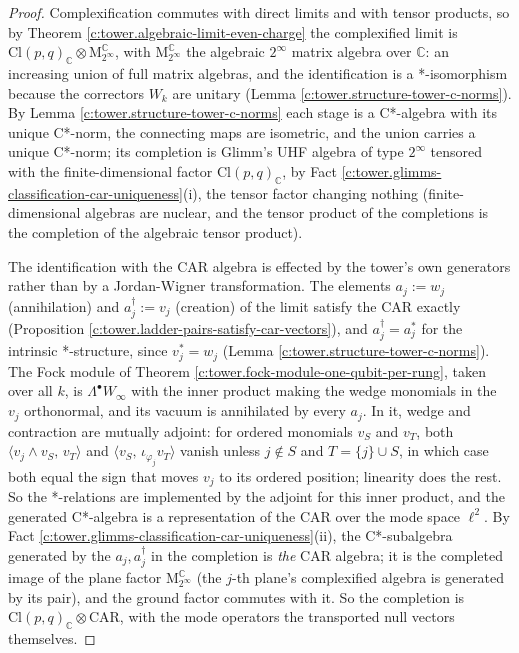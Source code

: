 \documentclass[11pt]{article}
\theoremstyle{definition}
\theoremstyle{plain}
\providecommand{\C}{}\renewcommand{\C}{\mathbb{C}}
\providecommand{\CAR}{}\renewcommand{\CAR}{\mathrm{CAR}}
\providecommand{\Cl}{}\renewcommand{\Cl}{\mathrm{Cl}}
\providecommand{\Mat}{}\renewcommand{\Mat}{\mathrm{M}}
\begin{document}
\begin{proof}
Complexification commutes with direct limits and with tensor products, so by Theorem \ref{c:tower.algebraic-limit-even-charge} the complexified limit is $\Cl(p,q)_\C \otimes \Mat_{2^\infty}^\C$, with $\Mat_{2^\infty}^\C$ the algebraic $2^\infty$ matrix algebra over $\C$: an increasing union of full matrix algebras, and the identification is a *-isomorphism because the correctors $W_k$ are unitary (Lemma \ref{c:tower.structure-tower-c-norms}). By Lemma \ref{c:tower.structure-tower-c-norms} each stage is a C*-algebra with its unique C*-norm, the connecting maps are isometric, and the union carries a unique C*-norm; its completion is Glimm's UHF algebra of type $2^\infty$ tensored with the finite-dimensional factor $\Cl(p,q)_\C$, by Fact \ref{c:tower.glimms-classification-car-uniqueness}(i), the tensor factor changing nothing (finite-dimensional algebras are nuclear, and the tensor product of the completions is the completion of the algebraic tensor product).

The identification with the CAR algebra is effected by the tower's own generators rather than by a Jordan-Wigner transformation. The elements $a_j := w_j$ (annihilation) and $a_j^\dagger := v_j$ (creation) of the limit satisfy the CAR exactly (Proposition \ref{c:tower.ladder-pairs-satisfy-car-vectors}), and $a_j^\dagger = a_j^*$ for the intrinsic *-structure, since $v_j^* = w_j$ (Lemma \ref{c:tower.structure-tower-c-norms}). The Fock module of Theorem \ref{c:tower.fock-module-one-qubit-per-rung}, taken over all $k$, is $\Lambda^\bullet W_\infty$ with the inner product making the wedge monomials in the $v_j$ orthonormal, and its vacuum is annihilated by every $a_j$. In it, wedge and contraction are mutually adjoint: for ordered monomials $v_S$ and $v_T$, both $\langle v_j \wedge v_S,\, v_T \rangle$ and $\langle v_S,\, \iota_{\varphi_j} v_T \rangle$ vanish unless $j \notin S$ and $T = \{j\} \cup S$, in which case both equal the sign that moves $v_j$ to its ordered position; linearity does the rest. So the *-relations are implemented by the adjoint for this inner product, and the generated C*-algebra is a representation of the CAR over the mode space $\ell^2$. By Fact \ref{c:tower.glimms-classification-car-uniqueness}(ii), the C*-subalgebra generated by the $a_j, a_j^\dagger$ in the completion is \emph{the} CAR algebra; it is the completed image of the plane factor $\Mat_{2^\infty}^\C$ (the $j$-th plane's complexified algebra is generated by its pair), and the ground factor commutes with it. So the completion is $\Cl(p,q)_\C \otimes \CAR$, with the mode operators the transported null vectors themselves.

\end{proof}
\end{document}
